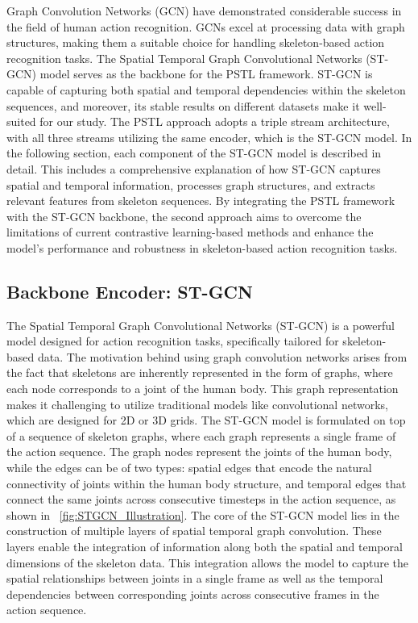Graph Convolution Networks (GCN) have demonstrated considerable success in the field of human action recognition. GCNs excel at processing data with graph structures, making them a suitable choice for handling skeleton-based action recognition tasks. The Spatial Temporal Graph Convolutional Networks (ST-GCN) model serves as the backbone for the PSTL framework. ST-GCN is capable of capturing both spatial and temporal dependencies within the skeleton sequences, and moreover, its stable results on different datasets make it well-suited for our study. The PSTL approach adopts a triple stream architecture, with all three streams utilizing the same encoder, which is the ST-GCN model. In the following section, each component of the ST-GCN model is described in detail. This includes a comprehensive explanation of how ST-GCN captures spatial and temporal information, processes graph structures, and extracts relevant features from skeleton sequences. By integrating the PSTL framework with the ST-GCN backbone, the second approach aims to overcome the limitations of current contrastive learning-based methods and enhance the model's performance and robustness in skeleton-based action recognition tasks. 

\subsection{Backbone Encoder: ST-GCN}
The Spatial Temporal Graph Convolutional Networks (ST-GCN) is a powerful model designed for action recognition tasks, specifically tailored for skeleton-based data. The motivation behind using graph convolution networks arises from the fact that skeletons are inherently represented in the form of graphs, where each node corresponds to a joint of the human body. This graph representation makes it challenging to utilize traditional models like convolutional networks, which are designed for 2D or 3D grids. The ST-GCN model is formulated on top of a sequence of skeleton graphs, where each graph represents a single frame of the action sequence. The graph nodes represent the joints of the human body, while the edges can be of two types: spatial edges that encode the natural connectivity of joints within the human body structure, and temporal edges that connect the same joints across consecutive timesteps in the action sequence, as shown in ~\ref{fig:STGCN_Illustration}. The core of the ST-GCN model lies in the construction of multiple layers of spatial temporal graph convolution. These layers enable the integration of information along both the spatial and temporal dimensions of the skeleton data. This integration allows the model to capture the spatial relationships between joints in a single frame as well as the temporal dependencies between corresponding joints across consecutive frames in the action sequence.

